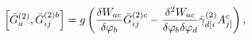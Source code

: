 \begin{equation}
\left[ \bar{G}_{a}^{(2)},\bar{G}_{ij}^{(2)b}\right] =g\left( \frac{\delta
W_{ac}}{\delta \varphi _{b}}\bar{G}_{ij}^{(2)c}-\frac{\delta ^{2}W_{ac}}{%
\delta \varphi _{b}\delta \varphi _{d}}\bar{\gamma}_{d[i}^{(2)}A_{j]}^{c}%
\right) ,  \label{i10}
\end{equation}

